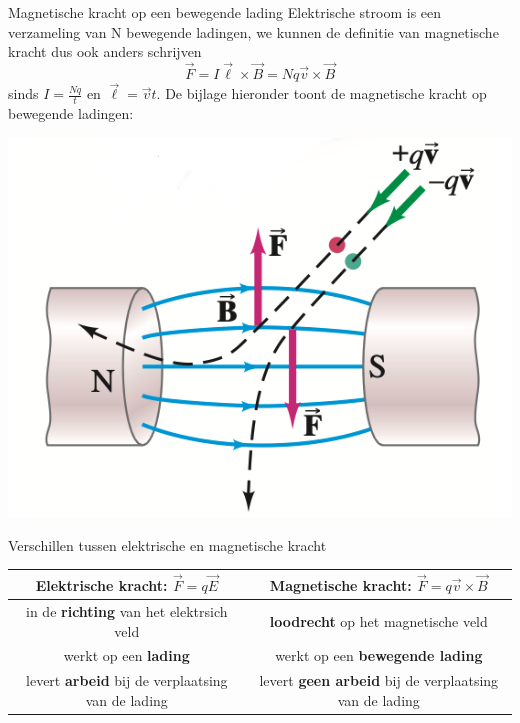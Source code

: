 \begin{theo}{Magnetische kracht op een bewegende lading}
    Elektrische stroom is een verzameling van N bewegende ladingen, we kunnen de definitie van magnetische kracht dus ook anders schrijven
    \begin{equation*}
        \Vec{F} = I\Vec{\ell} \times \Vec{B} = Nq\Vec{v} \times \Vec{B}
    \end{equation*}
    sinds $I = \tfrac{Nq}{t}$ en $\Vec{\ell} = \Vec{v}t$. De bijlage hieronder toont de magnetische kracht op bewegende ladingen:
    \begin{center}
        \includegraphics[scale=0.25]{Images/Magnetisme/MagnetischeKrachtOpBewgendeLading}
    \end{center}
\end{theo}

\begin{vrg}{Verschillen tussen elektrische en magnetische kracht}
    \vspace{-0.3cm}
    \def\arraystretch{2}
    \hspace{-0.35cm}
    \begin{tabular}{c|c}
        Elektrische kracht: $\Vec{F} = q\Vec{E}$ & Magnetische kracht: $\Vec{F} = q\Vec{v} \times \Vec{B}$ \\ \hline
        in de \textbf{richting} van het elektrsich veld & \textbf{loodrecht} op het magnetische veld \\
        werkt op een \textbf{lading} & werkt op een \textbf{bewegende lading} \\
        levert \textbf{arbeid} bij de verplaatsing van de lading & levert \textbf{geen arbeid} bij de verplaatsing van de lading \\
    \end{tabular}
\end{vrg}

